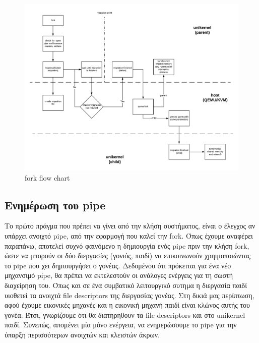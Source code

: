 \begin{figure}[htp]
\centerline{\includegraphics[scale=0.7]{figures/fork_olo.png}}
\caption{fork flow chart\label{fig4_8}}
\end{figure}

\subsection{Ενημέρωση του pipe}
Το πρώτο πράγμα που πρέπει να γίνει από την κλήση συστήματος, είναι ο έλεγχος αν
υπάρχει ανοιχτό pipe, από την εφαρμογή που καλεί την fork. Όπως έχουμε αναφέρει
παραπάνω, αποτελεί συχνό φαινόμενο η δημιουργία ενός pipe πριν την κλήση fork,
ώστε να μπορούν οι δύο διεργασίες (γονιός, παιδί) να επικοινωνούν χρηιμοποιώντας
το pipe που χει δημιουργήσει ο γονέας. Δεδομένου ότι πρόκειται για ένα νέο
μηχανσιμό pipe, θα πρέπει να εκτελεστούν οι ανάλογες ενέργεις για τη σωστή
διαχείρηση του. Όπως και σε ένα συμβατικό λειτουργικό συτημα η διεργασία παιδί
υιοθετεί τα ανοιχτά file descriptors της διεργασίας γονέας. Στη δικιά μας
περίπτωση, αφού έχουμε εικονικές μηχανές και η εικονική μηχανή παιδί είναι
κλώνος αυτής του γονέα. Έτσι, γνωρίζουμε ότι θα διατηρηθουν τα file descriptors
και στο unikernel παιδί. Συνεπώς, απομένει μία μόνο ενέργεια, να ενημερώσουμε το
pipe για την ύπαρξη περισσότερων ανοιχτών και κλειστών άκρων. 

